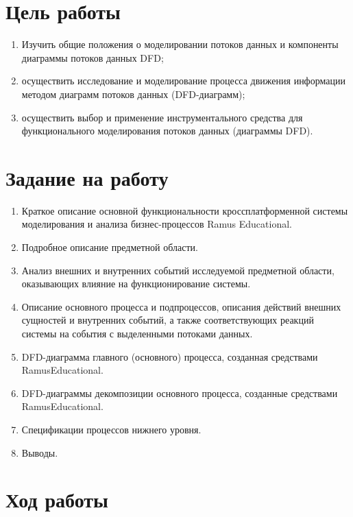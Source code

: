 \documentclass[a4paper,14pt]{extarticle}
\begin{document}


\section{Цель работы}
\begin{enumerate}
    \item Изучить общие положения о моделировании потоков данных и компоненты
          диаграммы потоков данных DFD;
    \item осуществить исследование и моделирование процесса движения
          информации методом диаграмм потоков данных (DFD-диаграмм);
    \item осуществить выбор и применение инструментального средства для
          функционального моделирования потоков данных (диаграммы DFD).
\end{enumerate}

\section{Задание на работу}
\begin{enumerate}
    \item Краткое описание основной функциональности кроссплатформенной системы
          моделирования и анализа бизнес-процессов Ramus Educational.
    \item Подробное описание предметной области.
    \item Анализ внешних и внутренних событий исследуемой предметной области,
          оказывающих влияние на функционирование системы.
    \item Описание основного процесса и подпроцессов, описания действий внешних
          сущностей и внутренних событий, а также соответствующих реакций системы на
          события с выделенными потоками данных.
    \item DFD-диаграмма главного (основного) процесса, созданная средствами
          RamusEducational.
    \item DFD-диаграммы декомпозиции основного процесса, созданные
          средствами RamusEducational.
    \item Спецификации процессов нижнего уровня.
    \item Выводы.
\end{enumerate}

\section{Ход работы}
\end{document}
